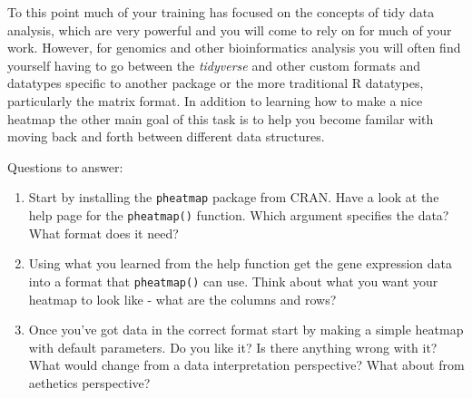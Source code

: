 \documentclass[
]{book}
\providecommand{\tightlist}{%
  \setlength{\itemsep}{0pt}\setlength{\parskip}{0pt}}
\begin{document}
To this point much of your training has focused on the concepts of tidy data analysis, which are very powerful and you will come to rely on for much of your work. However, for genomics and other bioinformatics analysis you will often find yourself having to go between the \emph{tidyverse} and other custom formats and datatypes specific to another package or the more traditional R datatypes, particularly the matrix format. In addition to learning how to make a nice heatmap the other main goal of this task is to help you become familar with moving back and forth between different data structures.

Questions to answer:

\begin{enumerate}
\def\labelenumi{\arabic{enumi}.}
\tightlist
\item
  Start by installing the \texttt{pheatmap} package from CRAN. Have a look at the help page for the \texttt{pheatmap()} function. Which argument specifies the data? What format does it need?
\item
  Using what you learned from the help function get the gene expression data into a format that \texttt{pheatmap()} can use. Think about what you want your heatmap to look like - what are the columns and rows?
\item
  Once you've got data in the correct format start by making a simple heatmap with default parameters. Do you like it? Is there anything wrong with it? What would change from a data interpretation perspective? What about from aethetics perspective?
\end{enumerate}

  
\end{document}
